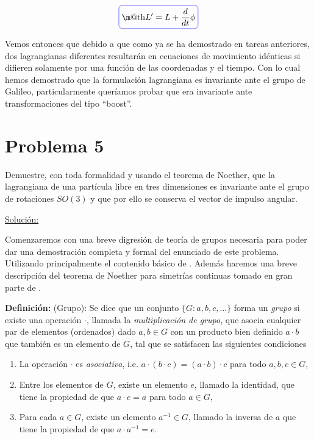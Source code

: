 \documentclass[a4paper,10pt]{article}
\makeatletter
\numberwithin{equation}{section}
\newcommand*{\boxcolor}{blue}
\renewcommand{\boxed}[1]{\textcolor{\boxcolor}{%
\tikz[baseline={([yshift=-1ex]current bounding box.center)}] \node [rectangle, minimum width=1ex,rounded corners,draw] {\normalcolor\m@th$\displaystyle#1$};}}
\newcommand{\definicion}{\textbf{Definición: }}
\makeatother
\begin{document}
\begin{equation}
 \boxed{L' = L + \frac{d}{dt}\phi}
\end{equation}

Vemos entonces que debido a que como ya se ha demostrado en tareas anteriores, dos lagrangianas 
diferentes resultarán en ecuaciones de movimiento idénticas si difieren solamente 
por una función de las coordenadas y el tiempo. Con lo cual hemos demostrado que 
la formulación lagrangiana es invariante ante el grupo de Galileo, particularmente 
queríamos probar que era invariante ante transformaciones del tipo ``boost''.

\section{Problema 5}

Demuestre, con toda formalidad y usando el teorema de Noether, que la lagrangiana 
de una partícula libre en tres dimensiones es invariante ante el grupo de rotaciones 
$SO(3)$ y que por ello se conserva el vector de impulso angular.

\vspace{.3cm}

\underline{Solución:} \vspace{.3cm}

Comenzaremos con una breve digresión de teoría de grupos necesaria para poder dar una 
demostración completa y formal del enunciado de este problema. Utilizando principalmente 
el contenido básico de \cite{tung}. Además haremos una breve descripción del teorema 
de Noether para simetrías continuas tomado en gran parte de \cite{kleinert}.

\vspace{.3cm}

\definicion (Grupo): Se dice que un conjunto $\{G:a,b,c,\dots\}$ forma un \emph{grupo}
si existe una operación $\cdot$, llamada la \emph{multiplicación de grupo}, que asocia 
cualquier par de elementos (ordenados) dado $a,b \in G$ con un producto bien definido 
$a\cdot b$ que también es un elemento de $G$, tal que se satisfacen las siguientes 
condiciones 

\begin{enumerate}[label=(\alph*)]
 \item La operación $\cdot$ es \emph{asociativa}, i.e. $a\cdot (b\cdot c) = (a\cdot b)\cdot c$ 
 para todo $a,b,c \in G$,
 \item Entre los elementos de $G$, existe un elemento $e$, llamado la identidad, que 
 tiene la propiedad de que $a\cdot e = a$ para todo $a \in G$,
 \item Para cada $a \in G$, existe un elemento $a^{-1} \in G$, llamado la inversa 
 de $a$ que tiene la propiedad de que $a\cdot a^{-1} = e$.
\end{enumerate}
\end{document}
